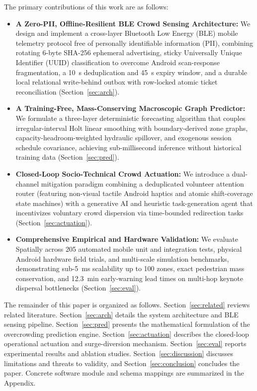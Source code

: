 \documentclass[conference,a4paper]{IEEEtran}
\begin{document}
The primary contributions of this work are as follows:
\begin{itemize}
    \item \textbf{A Zero-PII, Offline-Resilient BLE Crowd Sensing Architecture:} We design and implement a cross-layer Bluetooth Low Energy (BLE) mobile telemetry protocol free of personally identifiable information (PII), combining rotating 6-byte SHA-256 ephemeral advertising, sticky Universally Unique Identifier (UUID) classification to overcome Android scan-response fragmentation, a 10~s deduplication and 45~s expiry window, and a durable local relational write-behind outbox with row-locked atomic ticket reconciliation (Section~\ref{sec:arch}).
    \item \textbf{A Training-Free, Mass-Conserving Macroscopic Graph Predictor:} We formulate a three-layer deterministic forecasting algorithm that couples irregular-interval Holt linear smoothing with boundary-derived zone graphs, capacity-headroom-weighted hydraulic spillover, and exogenous session schedule covariance, achieving sub-millisecond inference without historical training data (Section~\ref{sec:pred}).
    \item \textbf{Closed-Loop Socio-Technical Crowd Actuation:} We introduce a dual-channel mitigation paradigm combining a deduplicated volunteer attention router (featuring non-visual tactile Android haptics and atomic shift-coverage state machines) with a generative AI and heuristic task-generation agent that incentivizes voluntary crowd dispersion via time-bounded redirection tasks (Section~\ref{sec:actuation}).
    \item \textbf{Comprehensive Empirical and Hardware Validation:} We evaluate Spatially across 205 automated mobile unit and integration tests, physical Android hardware field trials, and multi-scale simulation benchmarks, demonstrating sub-5~ms scalability up to 100 zones, exact pedestrian mass conservation, and 12.3~min early-warning lead times on multi-hop keynote dispersal bottlenecks (Section~\ref{sec:eval}).
\end{itemize}

The remainder of this paper is organized as follows. Section~\ref{sec:related} reviews related literature. Section~\ref{sec:arch} details the system architecture and BLE sensing pipeline. Section~\ref{sec:pred} presents the mathematical formulation of the overcrowding prediction engine. Section~\ref{sec:actuation} describes the closed-loop operational actuation and surge-diversion mechanism. Section~\ref{sec:eval} reports experimental results and ablation studies. Section~\ref{sec:discussion} discusses limitations and threats to validity, and Section~\ref{sec:conclusion} concludes the paper. Concrete software module and schema mappings are summarized in the Appendix.
\end{document}
